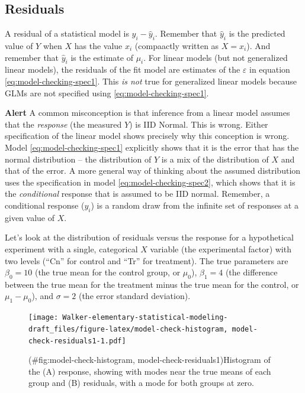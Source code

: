 \documentclass[]{book}
\begin{document}
\subsection{Residuals}\label{residuals}

A residual of a statistical model is \(y_i - \hat{y}_i\). Remember that
\(\hat{y}_i\) is the predicted value of \(Y\) when \(X\) has the value
\(x_i\) (compaactly written as \(X=x_i\)). And remember that
\(\hat{y}_i\) is the estimate of \(\mu_i\). For linear models (but not
generalized linear models), the residuals of the fit model are estimates
of the \(\varepsilon\) in equation \eqref{eq:model-checking-spec1}. This
\emph{is not} true for generalized linear models because GLMs are not
specified using \eqref{eq:model-checking-spec1}.

\textbf{Alert} A common misconception is that inference from a linear
model assumes that the \emph{response} (the measured \(Y\)) is IID
Normal. This is wrong. Either specification of the linear model shows
precisely why this conception is wrong. Model
\eqref{eq:model-checking-spec1} explicitly shows that it is the error that
has the normal distribution -- the distribution of \(Y\) is a mix of the
distribution of \(X\) and that of the error. A more general way of
thinking about the assumed distribution uses the specification in model
\eqref{eq:model-checking-spec2}, which shows that it is the
\emph{conditional} response that is assumed to be IID normal. Remember,
a conditional response (\(y_i\)) is a random draw from the infinite set
of responses at a given value of \(X\).

Let's look at the distribution of residuals versus the response for a
hypothetical experiment with a single, categorical \(X\) variable (the
experimental factor) with two levels (``Cn'' for control and ``Tr'' for
treatment). The true parameters are \(\beta_0 = 10\) (the true mean for
the control group, or \(\mu_{0}\)), \(\beta_1=4\) (the difference
between the true mean for the treatment minus the true mean for the
control, or \(\mu_1 - \mu_0\)), and \(\sigma = 2\) (the error standard
deviation).

\begin{figure}
\centering
\texttt{[image: Walker-elementary-statistical-modeling-draft\_files/figure-latex/model-check-histogram, model-check-residuals1-1.pdf]}
\caption{(\#fig:model-check-histogram, model-check-residuals1)Histogram
of the (A) response, showing with modes near the true means of each
group and (B) residuals, with a mode for both groups at zero.}
\end{figure}
\end{document}

